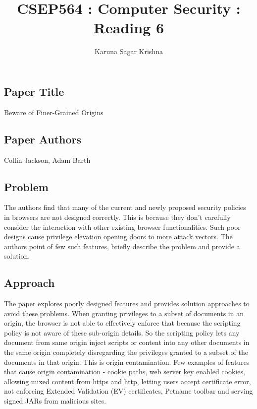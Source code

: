 \documentclass[12pt]{article}
\title{CSEP564 : Computer Security : Reading 6}
\author{Karuna Sagar Krishna}
\begin{document}
    \maketitle

    \subsection*{Paper Title}
    Beware of Finer-Grained Origins

    \subsection*{Paper Authors}
    Collin Jackson, Adam Barth

    \subsection*{Problem}
    The authors find that many of the current and newly proposed security policies in browsers are not designed correctly. This is because they don't carefully consider the interaction with other existing browser functionalities. Such poor designs cause privilege elevation opening doors to more attack vectors. The authors point of few such features, briefly describe the problem and provide a solution.

    \subsection*{Approach}
    The paper explores poorly designed features and provides solution approaches to avoid these problems. When granting privileges to a subset of documents in an origin, the browser is not able to effectively enforce that because the scripting policy is not aware of these sub-origin details. So the scripting policy lets any document from same origin inject scripts or content into any other documents in the same origin completely disregarding the privileges granted to a subset of the documents in that origin. This is origin contamination. Few examples of features that cause origin contamination - cookie paths, web server key enabled cookies, allowing mixed content from https and http, letting users accept certificate error, not enforcing Extended Validation (EV) certificates, Petname toolbar and serving signed JARs from malicious sites.
\end{document}
